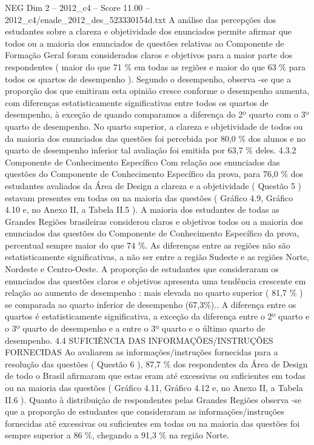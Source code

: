 \begin{textsample}{NEG Dim 2 – 2012\_c4 – Score 11.00 – 2012\_c4/enade\_2012\_des\_523330154d.txt}
A análise das percepções dos estudantes sobre a clareza e objetividade dos enunciados permite afirmar que todos ou a maioria dos enunciados de questões relativas ao Componente de Formação Geral foram considerados claros e objetivos para a maior parte dos respondentes ( maior do que 71 \% em todas as regiões e maior do que 63 \% para todos os quartos de desempenho ).
Segundo o desempenho, observa -se que a proporção dos que emitiram esta opinião cresce conforme o desempenho aumenta, com diferenças estatisticamente significativas entre todos os quartos de desempenho, à exceção de quando comparamos a diferença do 2º quarto com o 3º quarto de desempenho.
No quarto superior, a clareza e objetividade de todos ou da maioria dos enunciados das questões foi percebida por 80,0 \% dos alunos e no quarto de desempenho inferior tal avaliação foi emitida por 63,7 \% deles. 4.3.2 Componente de Conhecimento Específico Com relação aos enunciados das questões do Componente de Conhecimento Específico da prova, para 76,0 \% dos estudantes avaliados da Área de Design a clareza e a objetividade ( Questão 5 ) estavam presentes em todas ou na maioria das questões ( Gráfico 4.9, Gráfico 4.10 e, no Anexo II, a Tabela II.5 ).
A maioria dos estudantes de todas as Grandes Regiões brasileiras considerou claros e objetivos todos ou a maioria dos enunciados das questões do Componente de Conhecimento Específico da prova, percentual sempre maior do que 74 \%.
As diferenças entre as regiões não são estatisticamente significativas, a não ser entre a região Sudeste e as regiões Norte, Nordeste e Centro-Oeste.
A proporção de estudantes que consideraram os enunciados das questões claros e objetivos apresenta uma tendência crescente em relação ao aumento de desempenho : mais elevada no quarto superior ( 81,7 \% ) se comparada ao quarto inferior de desempenho (67,3\%)..
A diferença entre os quartos é estatisticamente significativa, a exceção da diferença entre o 2º quarto e o 3º quarto de desempenho e a entre o 3º quarto e o último quarto de desempenho. 4.4 SUFICIÊNCIA DAS INFORMAÇÕES/INSTRUÇÕES FORNECIDAS Ao avaliarem as informações/instruções fornecidas para a resolução das questões ( Questão 6 ), 87,7 \% dos respondentes da Área de Design de todo o Brasil afirmaram que estas eram até excessivas ou suficientes em todas ou na maioria das questões ( Gráfico 4.11, Gráfico 4.12 e, no Anexo II, a Tabela II.6 ).
Quanto à distribuição de respondentes pelas Grandes Regiões observa -se que a proporção de estudantes que consideraram as informações/instruções fornecidas até excessivas ou suficientes em todas ou na maioria das questões foi sempre superior a 86 \%, chegando a 91,3 \% na região Norte.

\end{textsample}
